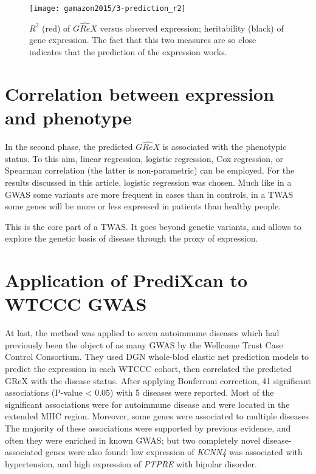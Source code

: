 \documentclass[../main.tex]{subfiles}
\begin{document}
\begin{figure}
	\centering
	\texttt{[image: gamazon2015/3-prediction\_r2]}
	\caption{$R^2$ (red) of $\widehat{GReX}$ versus observed expression; 
heritability (black) of gene expression. The fact that this two measures 
are so close indicates that the prediction of the expression works.}
\end{figure}

\section{Correlation between expression and phenotype}

In the second phase, the predicted $\widehat{GReX}$ is associated with 
the phenotypic status. To this aim, linear regression, logistic 
regression, Cox regression, or Spearman correlation (the latter is 
non-parametric) can be employed. For the results discussed in this 
article, logistic regression was chosen. Much like in a GWAS some 
variants are more frequent in cases than in controls, in a TWAS some 
genes will be more or less expressed in patients than healthy people.

This is the core part of a TWAS. It goes beyond genetic variants, and 
allows to explore the genetic basis of disease through the proxy of 
expression.

\section{Application of PrediXcan to WTCCC GWAS}

At last, the method was applied to seven autoimmune diseases which had 
previously been the object of as many GWAS by the Wellcome Trust Case 
Control Consortium. They used DGN whole-blod elastic net prediction 
models to predict the expression in each WTCCC cohort, then correlated 
the predicted GReX with the disease status. After applying Bonferroni 
correction, 41 significant associations (P-value < 0.05) with 5 diseases 
were reported. Most of the significant associations were for autoimmune 
disease and were located in the extended MHC 
region. 
Moreover, some genes were associated to multiple 
diseases The majority of these 
associations were supported by previous evidence, and often they were 
enriched in known GWAS; but two completely novel disease-associated 
genes were also found: low expression of \textit{KCNN4} was associated 
with hypertension, and high expression of \textit{PTPRE} with bipolar 
disorder.
\end{document}
